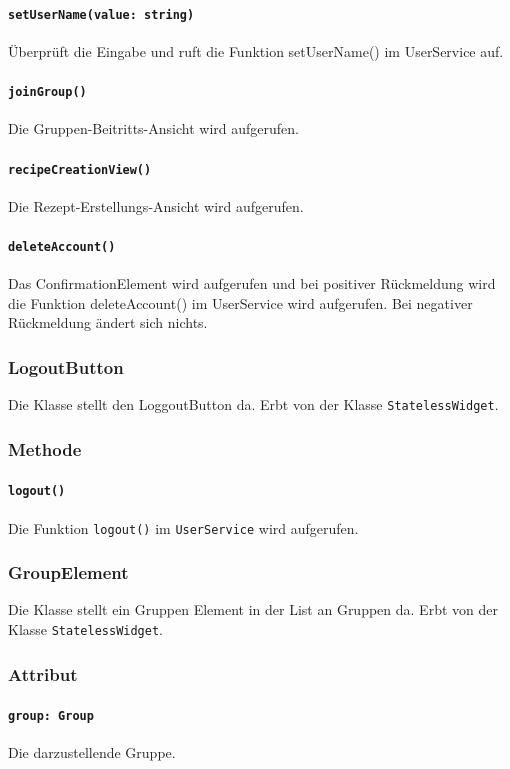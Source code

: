 \documentclass{entwurfsheft}
\begin{document}
            \paragraph*{\texttt{setUserName(value: string)}} Überprüft die Eingabe und ruft die Funktion setUserName() im UserService auf.
            \paragraph*{\texttt{joinGroup()}} Die Gruppen-Beitritts-Ansicht wird aufgerufen.
            \paragraph*{\texttt{recipeCreationView()}} Die Rezept-Erstellungs-Ansicht wird aufgerufen.
            \paragraph*{\texttt{deleteAccount()}} Das ConfirmationElement wird aufgerufen und bei positiver Rückmeldung wird die Funktion deleteAccount() im UserService wird aufgerufen. Bei negativer Rückmeldung ändert sich nichts. 
    
    \subsubsection{LogoutButton}
        Die Klasse stellt den LoggoutButton da. Erbt von der Klasse \texttt{StatelessWidget}.
        \subsubsection*{Methode}
            \paragraph*{\texttt{logout()}} Die Funktion \texttt{logout()} im \texttt{UserService} wird aufgerufen.
            
    \subsubsection*{GroupElement}
        Die Klasse stellt ein Gruppen Element in der List an Gruppen da. Erbt von der Klasse \texttt{StatelessWidget}.
        \subsubsection*{Attribut}
            \paragraph*{\texttt{group: Group}} Die darzustellende Gruppe.
\end{document}
